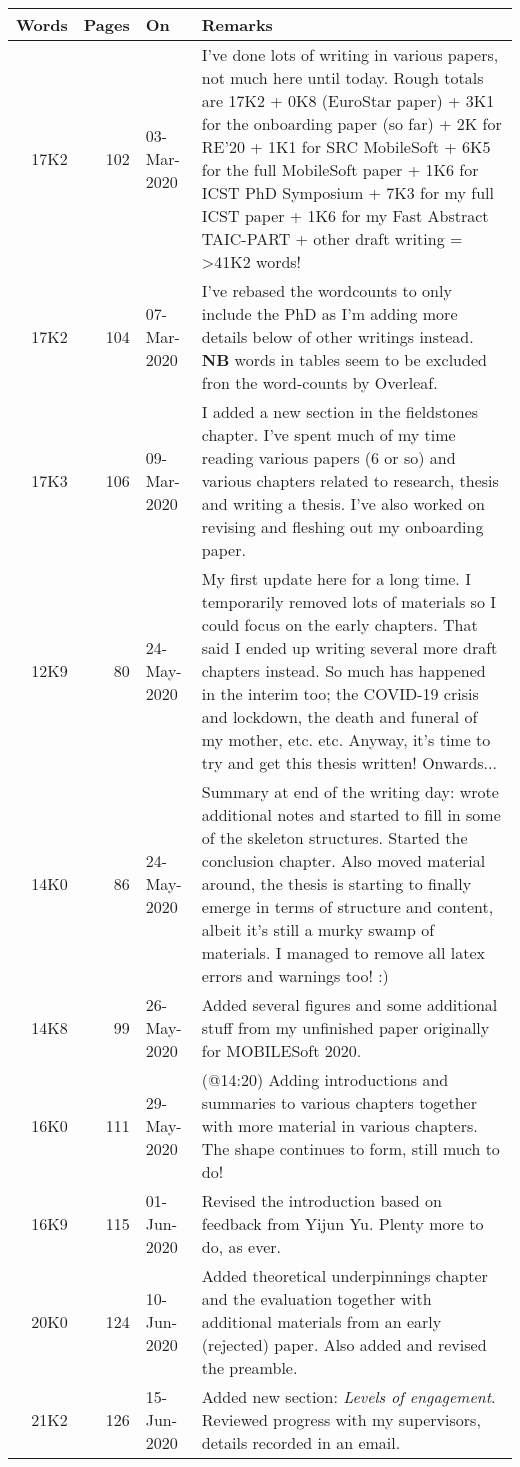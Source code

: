 \begin{table}[htpb]
    \centering
    \footnotesize
    \begin{tabular}{r|r|l|p{7.5cm}}
     Words &Pages  &On &Remarks\\
         \hline
         17K2 &102 &03-Mar-2020 &I've done lots of writing in various papers, not much here until today. Rough totals are 17K2 + 0K8 (EuroStar paper) + 3K1 for the onboarding paper (so far) + 2K for RE'20 + 1K1 for SRC MobileSoft + 6K5 for the full MobileSoft paper + 1K6 for ICST PhD Symposium + 7K3 for my full ICST paper + 1K6 for my Fast Abstract TAIC-PART + other draft writing = >41K2 words!\\
         17K2 &104 &07-Mar-2020 &I've rebased the wordcounts to only include the PhD as I'm adding more details below of other writings instead. \textbf{NB} words in tables seem to be excluded fron the word-counts by Overleaf.\\
         17K3 &106 &09-Mar-2020 &I added a new section in the fieldstones chapter. I've spent much of my time reading various papers (6 or so) and various chapters related to research, thesis and writing a thesis. I've also worked on revising and fleshing out my onboarding paper.\\
         12K9 &80 &24-May-2020 &My first update here for a long time. I temporarily removed lots of materials so I could focus on the early chapters. That said I ended up writing several more draft chapters instead. So much has happened in the interim too; the COVID-19 crisis and lockdown, the death and funeral of my mother, etc. etc. Anyway, it's time to try and get this thesis written! Onwards...\\
         14K0 &86 &24-May-2020 &Summary at end of the writing day: wrote additional notes and started to fill in some of the skeleton structures. Started the conclusion chapter. Also moved material around, the thesis is starting to finally emerge in terms of structure and content, albeit it's still a murky swamp of materials. I managed to remove all latex errors and warnings too! :)\\
         14K8 &99 &26-May-2020 &Added several figures and some additional stuff from my unfinished paper originally for MOBILESoft 2020.\\
         16K0 &111 &29-May-2020 &(@14:20) Adding introductions and summaries to various chapters together with more material in various chapters. The shape continues to form, still much to do!\\
         16K9 &115 &01-Jun-2020 &Revised the introduction based on feedback from Yijun Yu. Plenty more to do, as ever.\\
         20K0 &124 &10-Jun-2020 &Added theoretical underpinnings chapter and the evaluation together with additional materials from an early (rejected) paper. Also added and revised the preamble.\\
         21K2 &126 &15-Jun-2020 &Added new section: \emph{Levels of engagement}. Reviewed progress with my supervisors, details recorded in an email.
         

\end{tabular}
\end{table}
